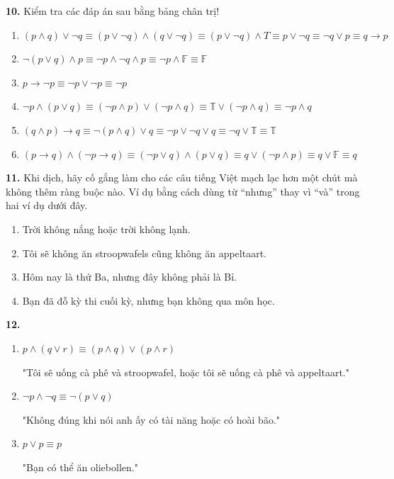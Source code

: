 \documentclass[12pt,a4paper]{article}
\theoremstyle{definition}
\begin{document}
\medskip
\textbf{10.} Kiểm tra các đáp án sau bằng bảng chân trị!
\begin{enumerate}[label=\textbf{\alph*)}]
\item $(p \land q) \lor \neg q \equiv (p \lor \neg q) \land (q \lor \neg q) \equiv (p \lor \neg q) \land T \equiv p \lor \neg q \equiv \neg q \lor p \equiv q \to p$
\item $\neg (p \lor q) \land p \equiv \neg p \land \neg q \land p \equiv \neg p \land \mathbb{F} \equiv \mathbb{F}$
\item $p \to \neg p \equiv \neg p \lor \neg p \equiv \neg p$
\item $\neg p \land (p \lor q) \equiv (\neg p \land p) \lor (\neg p \land q) \equiv \mathbb{T} \lor (\neg p \land q) \equiv \neg p \land q$
\item $(q \land p) \to q \equiv \neg (p \land q) \lor q \equiv \neg p \lor \neg q \lor q \equiv \neg q \lor \mathbb{T} \equiv \mathbb{T}$
\item $(p \to q) \land (\neg p \to q) \equiv (\neg p \lor q) \land (p \lor q) \equiv q \lor (\neg p \land p) \equiv q \lor \mathbb{F} \equiv q$
\end{enumerate}

\medskip
\textbf{11.} Khi dịch, hãy cố gắng làm cho các câu tiếng Việt mạch lạc hơn một chút mà không thêm ràng buộc nào. Ví dụ bằng cách dùng từ ``nhưng'' thay vì ``và'' trong hai ví dụ dưới đây.
\begin{enumerate}[label=\textbf{\alph*)}]
\item Trời không nắng hoặc trời không lạnh.
\item Tôi sẽ không ăn stroopwafels cũng không ăn appeltaart.
\item Hôm nay là thứ Ba, nhưng đây không phải là Bỉ.
\item Bạn đã đỗ kỳ thi cuối kỳ, nhưng bạn không qua môn học.
\end{enumerate}

\textbf{12.}
\begin{enumerate}[label=\textbf{\alph*)}]
\item $p \land (q \lor r) \equiv (p \land q) \lor (p \land r)$

"Tôi sẽ uống cà phê và stroopwafel, hoặc tôi sẽ uống cà phê và appeltaart."

\item $\neg p \land \neg q \equiv \neg (p \lor q)$

"Không đúng khi nói anh ấy có tài năng hoặc có hoài bão."
\item $p \lor p \equiv p$

"Bạn có thể ăn oliebollen."
\end{enumerate}
\end{document}
